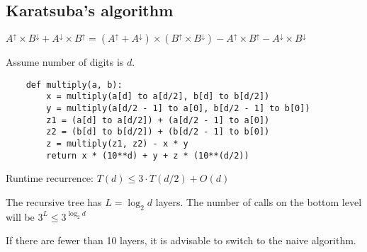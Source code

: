\documentclass[english,openany]{book}
\begin{document}
    \subsection{Karatsuba's algorithm}

    $A^\uparrow \times B^\downarrow + A^\downarrow \times B^\uparrow = (A^\uparrow + A^\downarrow) \times (B^\uparrow \times B^\downarrow) -A^\uparrow \times B^\uparrow - A^\downarrow \times B^\downarrow$

    Assume number of digits is $d$.

    \begin{lstlisting}
    def multiply(a, b):
        x = multiply(a[d] to a[d/2], b[d] to b[d/2])
        y = multiply(a[d/2 - 1] to a[0], b[d/2 - 1] to b[0])
        z1 = (a[d] to a[d/2]) + (a[d/2 - 1] to a[0])
        z2 = (b[d] to b[d/2]) + (b[d/2 - 1] to b[0])
        z = multiply(z1, z2) - x * y
        return x * (10**d) + y + z * (10**(d/2))
    \end{lstlisting}

    Runtime recurrence: $T(d) \leq 3 \cdot T(d/2) + O(d)$

    The recursive tree has $L = \log_2 d$ layers. The number of calls on the bottom level will be $3^L \leq 3^{\log_2 d}$

    If there are fewer than 10 layers, it is advisable to switch to the naive algorithm.
\end{document}
